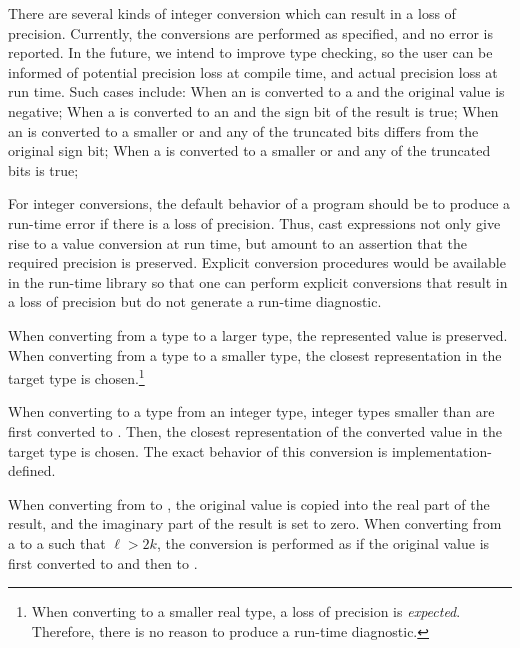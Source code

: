 \begin{future}
There are several kinds of integer conversion which can result in a loss of
precision.  Currently, the conversions are performed as specified, and no error
is reported.  In the future, we intend to improve type checking, so the user can
be informed of potential precision loss at compile time, and actual precision
loss at run time.  Such cases include:
%
When an  is converted to a  and the original value is
negative;
When a  is converted to an  and the sign bit of the result
is true;
When an  is converted to a smaller  or  and any
of the truncated bits differs from the original sign bit;
%
When a  is converted to a smaller  or  and any
of the truncated bits is true;
\end{future}

\begin{rationale}
For integer conversions, the default behavior of a program should be to produce
a run-time error if there is a loss of precision.  Thus, cast expressions not only
give rise to a value conversion at run time, but amount to an assertion
that the required precision is preserved.  Explicit conversion procedures would be
available in the run-time library so that one can perform explicit conversions
that result in a loss of precision but do not generate a run-time diagnostic.
\end{rationale}

When converting from a  type to a larger  type, the
represented value is preserved.  When converting from a  type to a
smaller  type, the closest representation in the target type is
chosen.\footnote{When converting to a smaller real type, a loss of precision is \emph{expected}.
Therefore, there is no reason to produce a run-time diagnostic.}

When converting to a  type from an integer type, integer types
smaller than  are first converted to .  Then, the closest
representation of the converted value in the target type is chosen.  The exact
behavior of this conversion is implementation-defined.

When converting from  to , the original
value is copied into the real part of the result, and the imaginary part of the
result is set to zero.  When converting from a  to
a  such that $\ell > 2k$, the conversion is performed as
if the original value is first converted to  and then
to \chpl{$\ell$}.

